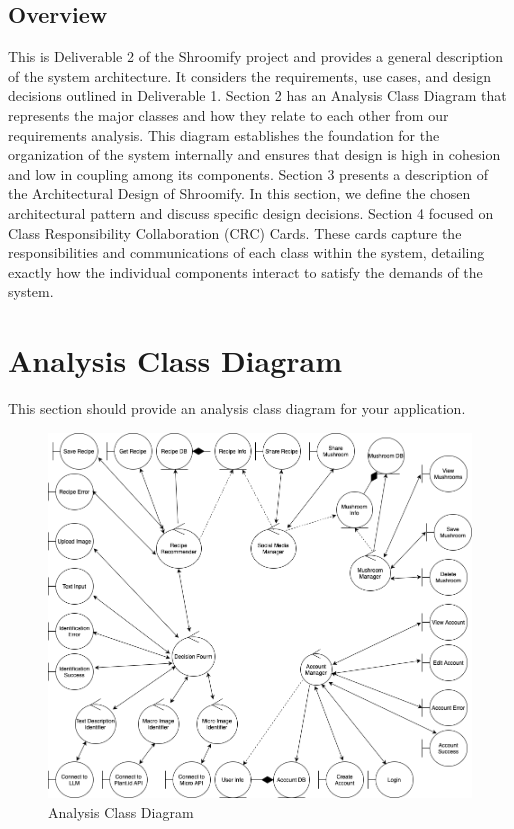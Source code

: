 \documentclass[]{article}
\begin{document}
\subsection{Overview}
\label{sub:overview}
This is Deliverable 2 of the Shroomify project and provides a general description of the system architecture. It considers the requirements, use cases, and design decisions outlined in Deliverable 1. Section 2 has an Analysis Class Diagram that represents the major classes and how they relate to each other from our requirements analysis. This diagram establishes the foundation for the organization of the system internally and ensures that design is high in cohesion and low in coupling among its components. Section 3 presents a description of the Architectural Design of Shroomify. In this section, we define the chosen architectural pattern and discuss specific design decisions. Section 4 focused on Class Responsibility Collaboration (CRC) Cards. These cards capture the responsibilities and communications of each class within the system, detailing exactly how the individual components interact to satisfy the demands of the system.


\clearpage
\section{Analysis Class Diagram}
\label{sec:analysis_class_diagram}
This section should provide an analysis class diagram for your application.
\begin{figure}[h]
    \centering
    \includegraphics[width=1\textwidth]{AnalysisClassDiagram.png}
    \caption{Analysis Class Diagram}
    \label{fig:sample}
\end{figure}
\end{document}
